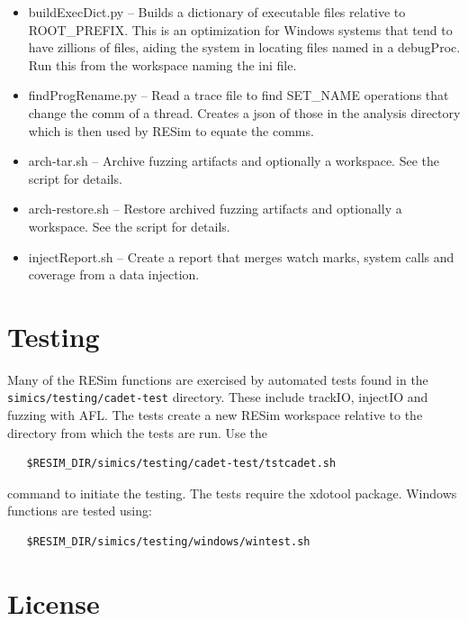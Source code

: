 \documentclass[titlepage]{article}
\begin{document}
\begin{itemize}
\item buildExecDict.py -- Builds a dictionary of executable files relative to ROOT\_PREFIX.  This is an optimization for Windows systems that tend to have zillions of
files, aiding the system in locating files named in a debugProc.  Run this from the workspace naming the ini file.
\item findProgRename.py -- Read a trace file to find SET\_NAME operations that change the comm of a thread.  Creates a json of those in the analysis directory
which is then used by RESim to equate the comms.
\item arch-tar.sh -- Archive fuzzing artifacts and optionally a workspace.  See the script for details.
\item arch-restore.sh -- Restore archived fuzzing artifacts and optionally a workspace.  See the script for details.
\item injectReport.sh -- Create a report that merges watch marks, system calls and coverage from a data injection.

\end{itemize}

\section{Testing}
Many of the RESim functions are exercised by automated tests found in the {\tt simics/testing/cadet-test} directory.
These include trackIO, injectIO and fuzzing with AFL.  The tests create a new RESim workspace relative to
the directory from which the tests are run.  Use the
\begin{verbatim}
   $RESIM_DIR/simics/testing/cadet-test/tstcadet.sh
\end{verbatim}
\noindent command to initiate the testing.  The tests require the xdotool package.
Windows functions are tested using:
\begin{verbatim}
   $RESIM_DIR/simics/testing/windows/wintest.sh
\end{verbatim}

\section{License}
\end{document}
